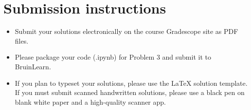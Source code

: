 \documentclass[11pt]{article}
\begin{document}
\author{}
\date{}
\vspace{-1in}
\maketitle
\vspace{-0.75in}




\ifsoln 
\else
\section*{Submission instructions}
\begin{itemize}
\item 
Submit your solutions electronically on the course Gradescope site as PDF files.
\item Please package your code (.ipynb) for Problem 3 and submit it to BruinLearn.
\item If you plan to typeset your solutions, please use the LaTeX solution template. If you must submit scanned handwritten solutions, please use a black pen on blank white paper and a high-quality scanner app.
\end{itemize}
\fi

\ifnotsolution{\newpage}

\ifsoln 
\else
\clearpage
\fi




\end{document}
